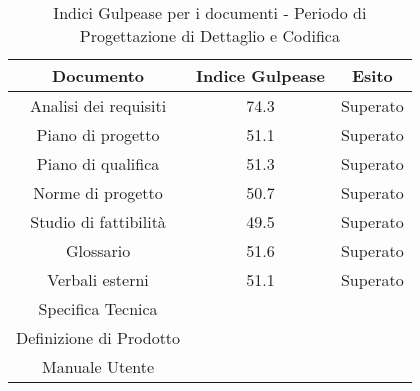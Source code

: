       
      \begin{table}[H]
        \centering
        \begin{tabular}{|c|c|c|}
          \hline
          \textbf{Documento} & \textbf{Indice Gulpease} & \textbf{Esito}\\
          \hline
          Analisi dei requisiti & 74.3  & Superato \\
          Piano di progetto & 51.1  & Superato \\
          Piano di qualifica  & 51.3  & Superato \\
          Norme di progetto & 50.7  & Superato \\
          Studio di fattibilità & 49.5  & Superato \\
          Glossario & 51.6  & Superato  \\
          Verbali esterni & 51.1  & Superato \\
          Specifica Tecnica &  & \\
          Definizione di Prodotto &  & \\
          Manuale Utente &  & \\
          \hline
        \end{tabular}
        \caption{Indici Gulpease per i documenti - Periodo di Progettazione di Dettaglio e Codifica}
      \end{table}

